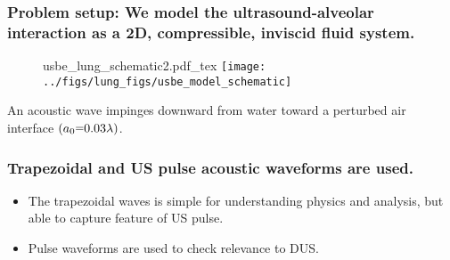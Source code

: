 \begin{frame} \frametitle{Problem setup: We model the ultrasound-alveolar interaction as a 2D, compressible, inviscid fluid system.}
  \begin{figure}
    \centering
    \def\svgwidth{0.48\textwidth}
    {\footnotesize
      {usbe_lung_schematic2.pdf_tex} \hfill%
    }
    \texttt{[image: ../figs/lung\_figs/usbe\_model\_schematic]} \hfill
  \end{figure}
  An acoustic wave impinges downward from water toward a perturbed air interface $(a_0\equals0.03\lambda)$.
\end{frame}
\begin{frame} \frametitle{Trapezoidal and US pulse acoustic waveforms are used.}
  \begin{figure}
    \centering
    \hfill%
  \end{figure}
  \begin{itemize}
  \item The trapezoidal waves is simple for understanding physics and analysis, but able to capture feature of US pulse.
  \item Pulse waveforms are used to check relevance to DUS.
  \end{itemize}
\end{frame}
